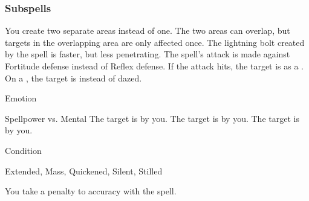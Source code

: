 \subsubsection{Subspells}
You create two separate areas instead of one.
The two areas can overlap, but targets in the overlapping area are only affected once.
The lightning bolt created by the spell is faster, but less penetrating.
The spell's attack is made against Fortitude defense instead of Reflex defense.
If the attack hits, the target is  as a .
On a , the target is  instead of dazed.
\begin{spellsection}{Emotion}
\begin{spellheader}
\end{spellheader}
\begin{spellcontent}
\begin{spelltargetinginfo}
\end{spelltargetinginfo}
\begin{spelleffects}
\begin{spellattack}{Spellpower vs. Mental}
\spellsuccess The target is \frightened by you.
\spellcritical The target is \panicked by you.
\spellfailure The target is \shaken by you.
\end{spellattack}
\spelldur Condition
\end{spelleffects}
\end{spellcontent}
\begin{spellfooter}
 Extended, Mass, Quickened, Silent, Stilled
\end{spellfooter}
\begin{spellsubcontent}
\begin{spellcantrip}
You take a  penalty to accuracy with the spell.
\end{spellcantrip}
\end{spellsubcontent}
\end{spellsection}

